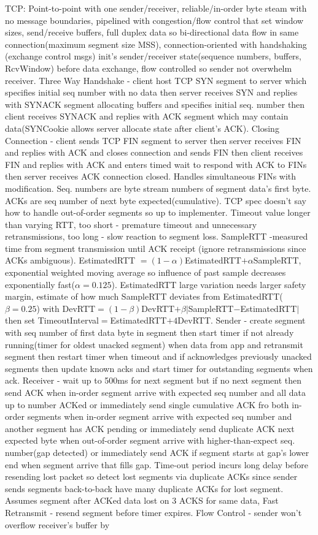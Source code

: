 \documentclass[8pt]{extarticle}
\begin{document}
\begin{multicols}{2}
TCP: Point-to-point with one sender/receiver, reliable/in-order byte steam with no message boundaries, pipelined with congestion/flow control that set window sizes, send/receive buffers, full duplex data so bi-directional data flow in same connection(maximum segment size MSS), connection-oriented with handshaking (exchange control msgs) init’s sender/receiver state(sequence numbers, buffers, RcvWindow) before data exchange, flow controlled so sender not overwhelm receiver. Three Way Handshake - client host TCP SYN segment to server which specifies initial seq number with no data then server receives SYN and replies with SYNACK segment allocating buffers and specifies initial seq. number then client receives SYNACK and replies with ACK segment which may contain data(SYNCookie allows server allocate state after client's ACK). Closing Connection - client sends TCP FIN segment to server then server receives FIN and replies with ACK and closes connection and sends FIN then client receives FIN and replies with ACK and enters timed wait to respond with ACK to FINs then server receives ACK connection closed. Handles simultaneous FINs with modification. Seq. numbers are byte stream numbers of segment data's first byte. ACKs are seq number of next byte expected(cumulative). TCP spec doesn’t say how to handle out-of-order segments so up to implementer. Timeout value longer than varying RTT, too short - premature timeout and unnecessary retransmissions, too long - slow reaction to segment loss. SampleRTT -measured time from segment transmission until ACK receipt (ignore retransmissions since ACKs ambiguous). EstimatedRTT $= (1-\alpha)$EstimatedRTT$+ \alpha$SampleRTT, exponential weighted moving average so influence of past sample decreases exponentially fast($\alpha{=0.125}$).  EstimatedRTT large variation needs larger safety margin, estimate of how much SampleRTT deviates from EstimatedRTT($\beta{=0.25}$) with DevRTT$=(1-\beta)$DevRTT$+\beta{|}$SampleRTT$-$EstimatedRTT$|$ then set TimeoutInterval$=$EstimatedRTT$+4$DevRTT. Sender - create segment with seq number of first data byte in segment then start timer if not already running(timer for oldest unacked segment) when data from app and retransmit segment then restart timer when timeout and if acknowledges previously unacked segments then update known acks and start timer for outstanding segments when ack. Receiver - wait up to 500ms for next segment but if no next segment then send ACK when in-order segment arrive with expected seq number and all data up to number ACKed or immediately send single cumulative ACK fro both in-order segments when in-order segment arrive with expected seq number and another segment has ACK pending or immediately send duplicate ACK next expected byte when out-of-order segment arrive with higher-than-expect seq. number(gap detected) or immediately send ACK if segment starts at gap's lower end when segment arrive that fills gap. Time-out period incurs long delay before resending lost packet so detect lost segments via duplicate ACKs since sender sends segments back-to-back have many duplicate ACKs for lost segment. Assumes segment after ACKed data lost on 3 ACKS for same data, Fast Retransmit  - resend segment before timer expires. Flow Control - sender won’t overflow receiver’s buffer by 
\end{multicols}
\end{document}
